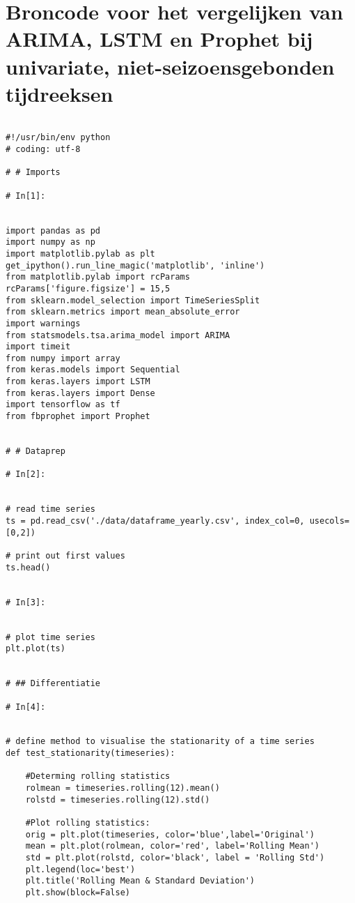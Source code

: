 \section{Broncode voor het vergelijken van ARIMA, LSTM en Prophet bij univariate, niet-seizoensgebonden tijdreeksen}  %
\begin{verbatim}

#!/usr/bin/env python
# coding: utf-8

# # Imports 

# In[1]:


import pandas as pd
import numpy as np
import matplotlib.pylab as plt
get_ipython().run_line_magic('matplotlib', 'inline')
from matplotlib.pylab import rcParams
rcParams['figure.figsize'] = 15,5
from sklearn.model_selection import TimeSeriesSplit
from sklearn.metrics import mean_absolute_error
import warnings
from statsmodels.tsa.arima_model import ARIMA
import timeit
from numpy import array
from keras.models import Sequential
from keras.layers import LSTM
from keras.layers import Dense
import tensorflow as tf
from fbprophet import Prophet


# # Dataprep

# In[2]:


# read time series
ts = pd.read_csv('./data/dataframe_yearly.csv', index_col=0, usecols=[0,2])

# print out first values
ts.head()


# In[3]:


# plot time series
plt.plot(ts)


# ## Differentiatie

# In[4]:


# define method to visualise the stationarity of a time series
def test_stationarity(timeseries):
    
    #Determing rolling statistics
    rolmean = timeseries.rolling(12).mean()
    rolstd = timeseries.rolling(12).std()

    #Plot rolling statistics:
    orig = plt.plot(timeseries, color='blue',label='Original')
    mean = plt.plot(rolmean, color='red', label='Rolling Mean')
    std = plt.plot(rolstd, color='black', label = 'Rolling Std')
    plt.legend(loc='best')
    plt.title('Rolling Mean & Standard Deviation')
    plt.show(block=False)
    

\end{verbatim}
